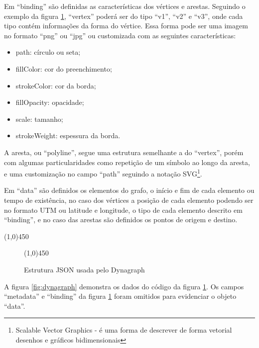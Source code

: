Em ``binding'' são definidas as características dos vértices e arestas. Seguindo o exemplo da figura \ref{fig:jsondyn}, ``vertex'' poderá
ser do tipo ``v1'', ``v2'' e ``v3'', onde cada tipo contém informações da forma do vértice. Essa forma pode ser uma imagem no formato
``png'' ou ``jpg'' ou customizada com as seguintes características:
\begin{itemize}
\item path: círculo ou seta;
\item fillColor: cor do preenchimento;
\item strokeColor: cor da borda;
\item fillOpacity: opacidade;
\item scale: tamanho;
\item strokeWeight: espessura da borda.
\end{itemize}
A aresta, ou ``polyline'', segue uma estrutura semelhante a do ``vertex'', porém com algumas particularidades como repetição de um símbolo
ao longo da aresta, e uma customização no campo ``path'' seguindo a notação
SVG\footnote{\label{note} Scalable Vector Graphics - é uma forma de descrever de forma vetorial desenhos e gráficos bidimensionais}.

Em ``data'' são definidos os elementos do grafo, o início e fim de cada elemento ou tempo de existência, no caso dos vértices a posição de cada elemento
podendo ser no formato UTM ou latitude e longitude, o tipo de cada elemento descrito em ``binding'', e no caso das arestas são definidos os 
pontos de origem e destino.

\begin{center}
  \line(1,0){450}
\end{center}

\begin{figure}[htbp]
  \begin{center}
    \line(1,0){450}
  \end{center}
  \centering
  \caption{Estrutura JSON usada pelo Dynagraph}
  \label{fig:jsondyn}
\end{figure}

A figura \ref{fig:dynagraph} demonstra os dados do código da figura \ref{fig:jsondyn}. Os campos
``metadata'' e ``binding'' da figura \ref{fig:jsondyn} foram omitidos para evidenciar o objeto ``data''.

